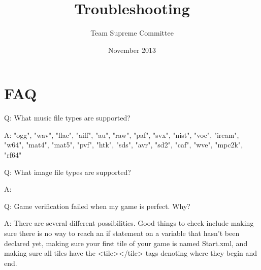 \documentclass[11pt]{article}
\begin{document}
\lstset{language=XML}
\title{Troubleshooting}
\author{Team Supreme Committee}
\date{November 2013}
\maketitle

\section{FAQ}

Q: What music file types are supported?

A: 
"ogg", "wav", "flac", "aiff", "au", 
"raw", "paf", "svx", "nist", "voc", 
"ircam", "w64", "mat4", "mat5", "pvf", 
"htk", "sds", "avr", "sd2", "caf", "wve", "mpc2k", "rf64"

Q: What image file types are supported?

A:


Q: Game verification failed when my game is perfect. Why?

A: There are several different possibilities. Good things to check include making sure there is no way to reach an if statement on a variable that hasn't been declared yet, making sure your first tile of your game is named Start.xml, and making sure all tiles have the <tile></tile> tags denoting where they begin and end. 
\end{document}
